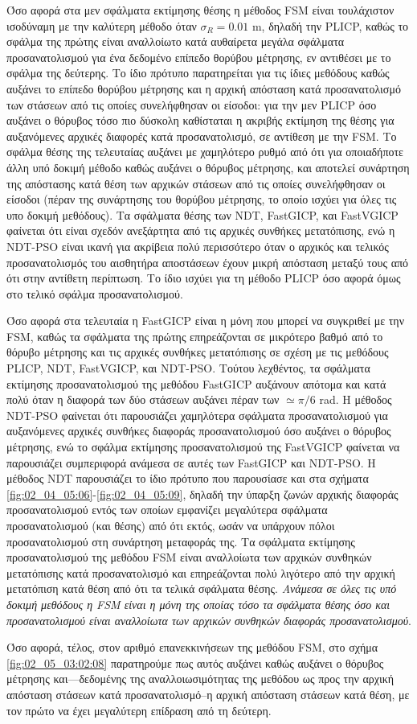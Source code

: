 Όσο αφορά στα μεν σφάλματα εκτίμησης θέσης η μέθοδος FSM είναι τουλάχιστον
ισοδύναμη με την καλύτερη μέθοδο όταν $\sigma_R = 0.01$ m, δηλαδή την PLICP,
καθώς το σφάλμα της πρώτης είναι αναλλοίωτο κατά αυθαίρετα μεγάλα σφάλματα
προσανατολισμού για ένα δεδομένο επίπεδο θορύβου μέτρησης, εν αντιθέσει με το
σφάλμα της δεύτερης. Το ίδιο πρότυπο παρατηρείται για τις ίδιες μεθόδους καθώς
αυξάνει το επίπεδο θορύβου μέτρησης και η αρχική απόσταση κατά προσανατολισμό
των στάσεων από τις οποίες συνελήφθησαν οι είσοδοι: για την μεν PLICP όσο
αυξάνει ο θόρυβος τόσο πιο δύσκολη καθίσταται η ακριβής εκτίμηση της θέσης για
αυξανόμενες αρχικές διαφορές κατά προσανατολισμό, σε αντίθεση με την FSM. Το
σφάλμα θέσης της τελευταίας αυξάνει με χαμηλότερο ρυθμό από ότι για οποιαδήποτε
άλλη υπό δοκιμή μέθοδο καθώς αυξάνει ο θόρυβος μέτρησης, και αποτελεί συνάρτηση
της απόστασης κατά θέση των αρχικών στάσεων από τις οποίες συνελήφθησαν οι
είσοδοι (πέραν της συνάρτησης του θορύβου μέτρησης, το οποίο ισχύει για όλες
τις υπο δοκιμή μεθόδους). Τα σφάλματα θέσης των NDT, FastGICP, και FastVGICP
φαίνεται ότι είναι σχεδόν ανεξάρτητα από τις αρχικές συνθήκες μετατόπισης, ενώ
η NDT-PSO είναι ικανή για ακρίβεια πολύ περισσότερο όταν ο αρχικός και τελικός
προσανατολισμός του αισθητήρα αποστάσεων έχουν μικρή απόσταση μεταξύ τους από
ότι στην αντίθετη περίπτωση. Το ίδιο ισχύει για τη μέθοδο PLICP όσο αφορά όμως
στο τελικό σφάλμα προσανατολισμού.

Όσο αφορά στα τελευταία η FastGICP είναι η μόνη που μπορεί να συγκριθεί με την
FSM, καθώς τα σφάλματα της πρώτης επηρεάζονται σε μικρότερο βαθμό από το θόρυβο
μέτρησης και τις αρχικές συνθήκες μετατόπισης σε σχέση με τις μεθόδους PLICP,
NDT, FastVGICP, και NDT-PSO. Τούτου λεχθέντος, τα σφάλματα εκτίμησης
προσανατολισμού της μεθόδου FastGICP αυξάνουν απότομα και κατά πολύ όταν η
διαφορά των δύο στάσεων αυξάνει πέραν των $\simeq \pi/6$ rad.  Η μέθοδος
NDT-PSO φαίνεται ότι παρουσιάζει χαμηλότερα σφάλματα προσανατολισμού για
αυξανόμενες αρχικές συνθήκες διαφοράς προσανατολισμού όσο αυξάνει ο θόρυβος
μέτρησης, ενώ το σφάλμα εκτίμησης προσανατολισμού της FastVGICP φαίνεται να
παρουσιάζει συμπεριφορά ανάμεσα σε αυτές των FastGICP και NDT-PSO. Η μέθοδος
NDT παρουσιάζει το ίδιο πρότυπο που παρουσίασε και στα σχήματα
\ref{fig:02_04_05:06}-\ref{fig:02_04_05:09}, δηλαδή την ύπαρξη ζωνών αρχικής
διαφοράς προσανατολισμού εντός των οποίων εμφανίζει μεγαλύτερα σφάλματα
προσανατολισμού (και θέσης) από ότι εκτός, ωσάν να υπάρχουν πόλοι
προσανατολισμού στη συνάρτηση μεταφοράς της. Τα σφάλματα εκτίμησης
προσανατολισμού της μεθόδου FSM είναι αναλλοίωτα των αρχικών συνθηκών
μετατόπισης κατά προσανατολισμό και επηρεάζονται πολύ λιγότερο από την αρχική
μετατόπιση κατά θέση από ότι τα τελικά σφάλματα θέσης. \textit{Ανάμεσα σε όλες
τις υπό δοκιμή μεθόδους η FSM είναι η μόνη της οποίας τόσο τα σφάλματα θέσης
όσο και προσανατολισμού είναι αναλλοίωτα των αρχικών συνθηκών διαφοράς
προσανατολισμού}.

Όσο αφορά, τέλος, στον αριθμό επανεκκινήσεων της μεθόδου FSM, στο σχήμα
\ref{fig:02_05_03:02:08} παρατηρούμε πως αυτός αυξάνει καθώς αυξάνει ο θόρυβος
μέτρησης και---δεδομένης της αναλλοιωσιμότητας της μεθόδου ως προς την αρχική
απόσταση στάσεων κατά προσανατολισμό--η αρχική απόσταση στάσεων κατά θέση,
με τον πρώτο να έχει μεγαλύτερη επίδραση από τη δεύτερη.
